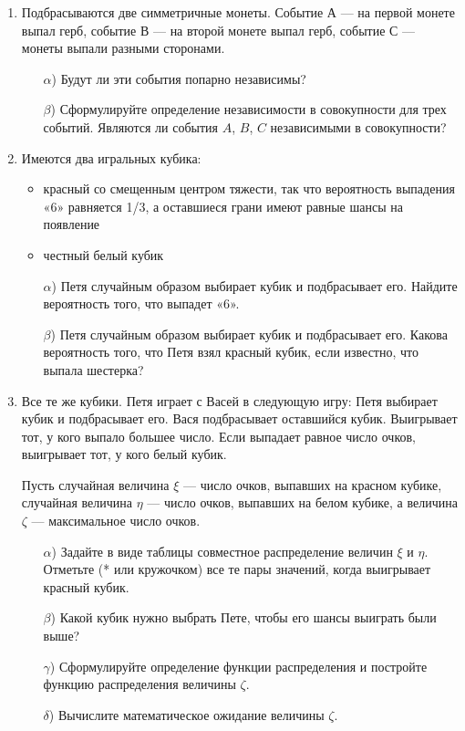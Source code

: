 \documentclass[12pt, a4paper]{article}\usepackage[]{graphicx}\usepackage[]{color}
\begin{document}
\begin{enumerate}
\item
Подбрасываются две симметричные монеты. Событие А — на первой монете выпал
герб, событие В — на второй монете выпал герб, событие С — монеты выпали
разными сторонами.
\begin{enumerate}
    \item[$\alpha$)] Будут ли эти события попарно независимы?
    \item[$\beta$)]  Сформулируйте определение независимости в совокупности для трех событий. Являются ли события $A$, $B$, $C$ независимыми в совокупности?
\end{enumerate}

\item
Имеются два игральных кубика:
\begin{itemize}
    \item красный со смещенным центром тяжести, так что вероятность выпадения «6»
    равняется 1/3, а оставшиеся грани имеют равные шансы на появление
    \item честный белый кубик
\end{itemize}

\begin{enumerate}
    \item[$\alpha$)] Петя случайным образом выбирает кубик и подбрасывает его. Найдите
    вероятность того, что выпадет «6».
    \item[$\beta$)]   Петя случайным образом выбирает кубик и подбрасывает его. Какова
    вероятность того, что Петя взял красный кубик, если известно, что выпала
    шестерка?
\end{enumerate}

\item
Все те же кубики. Петя играет с Васей в следующую игру: Петя выбирает кубик и
подбрасывает его. Вася подбрасывает оставшийся кубик. Выигрывает тот, у кого
выпало большее число. Если выпадает равное число очков, выигрывает тот, у кого
белый кубик.

Пусть случайная величина $\xi$ — число очков, выпавших на красном кубике, случайная величина $\eta$ — число очков,
выпавших на белом кубике, а величина $\zeta$ — максимальное число очков.

\begin{enumerate}
    \item[$\alpha$)] Задайте в виде таблицы совместное распределение величин $\xi$ и $\eta$. Отметьте (* или кружочком) все те пары значений, когда выигрывает красный кубик.
    \item[$\beta$)] Какой кубик нужно выбрать Пете, чтобы его шансы выиграть были выше?
    \item[$\gamma$)] Сформулируйте определение функции распределения и постройте функцию
    распределения величины $\zeta$.
    \item[$\delta$)] Вычислите математическое ожидание величины $\zeta$.
\end{enumerate}


\end{enumerate}
\end{document}

